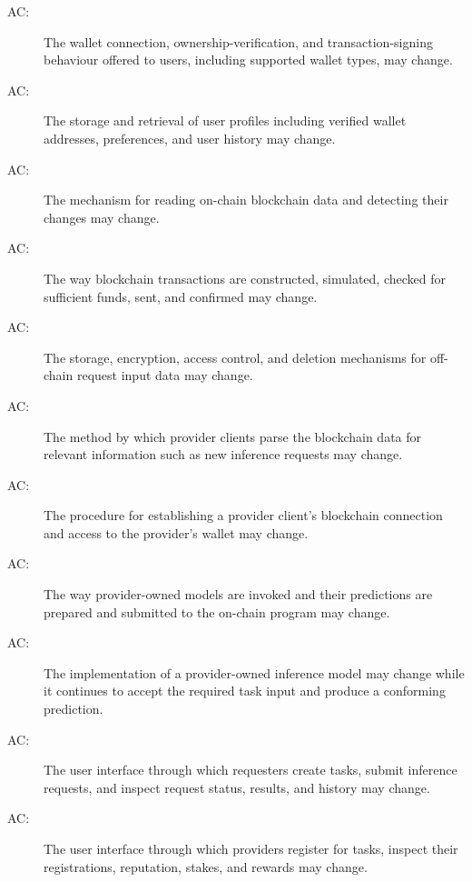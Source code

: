 \documentclass[12pt, titlepage]{article}
\newcounter{acnum}
\newcommand{\actheacnum}{AC\theacnum}
\begin{document}
\begin{description}
\item[ \actheacnum \label{acWalletIntegration}:] The wallet connection, ownership-verification, and transaction-signing behaviour offered to users, including supported wallet types, may change.

\item[ \actheacnum \label{acUserInformation}:] The storage and retrieval of user profiles including verified wallet addresses, preferences, and user history may change.

\item[ \actheacnum \label{acChainObservation}:] The mechanism for reading on-chain blockchain data and detecting their changes may change.

\item[ \actheacnum \label{acTransactions}:] The way blockchain transactions are constructed, simulated, checked for sufficient funds, sent, and confirmed may change.

\item[ \actheacnum \label{acRequestInputs}:] The storage, encryption, access control, and deletion mechanisms for off-chain request input data may change.

\item[ \actheacnum \label{acRequestListening}:] The method by which provider clients parse the blockchain data for relevant information such as new inference requests may change.

\item[ \actheacnum \label{acProviderSetup}:] The procedure for establishing a provider client's blockchain connection and access to the provider's wallet may change.

\item[ \actheacnum \label{acParticipation}:] The way provider-owned models are invoked and their predictions are prepared and submitted to the on-chain program may change.

\item[ \actheacnum \label{acModel}:] The implementation of a provider-owned inference model may change while it continues to accept the required task input and produce a conforming prediction.

\item[ \actheacnum \label{acRequesterInterface}:] The user interface through which requesters create tasks, submit inference requests, and inspect request status, results, and history may change.

\item[ \actheacnum \label{acProviderInterface}:] The user interface through which providers register for tasks, inspect their registrations, reputation, stakes, and rewards may change.

\end{description}
\end{document}
